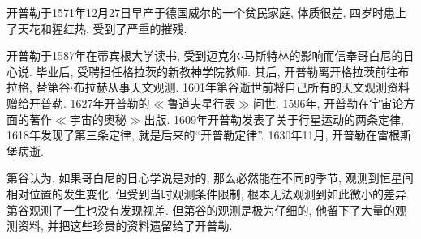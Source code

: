 \documentclass[11pt,a4paper,boxed]{caspset}
\newlength\picwidth
\newlength\pichigh
\begin{document}
\begin{window}
开普勒于1571年12月27日早产于德国威尔的一个贫民家庭, 体质很差, 四岁时患上了天花和猩红热, 受到了严重的摧残.

开普勒于1587年在蒂宾根大学读书, 受到迈克尔$\cdot$马斯特林的影响而信奉哥白尼的日心说. 毕业后, 受聘担任格拉茨的新教神学院教师. 其后, 开普勒离开格拉茨前往布拉格, 替第谷$\cdot$布拉赫从事天文观测. 1601年第谷逝世前将自己所有的天文观测资料赠给开普勒. 1627年开普勒的$\ll$鲁道夫星行表$\gg$问世.
1596年, 开普勒在宇宙论方面的著作$\ll$宇宙的奧秘$\gg$出版. 1609年开普勒发表了关于行星运动的两条定律, 1618年发现了第三条定律, 就是后来的``开普勒定律''.
1630年11月, 开普勒在雷根斯堡病逝.
\end{window}

第谷认为, 如果哥白尼的日心学说是对的, 那么必然能在不同的季节, 观测到恒星间相对位置的发生变化. 但受到当时观测条件限制, 根本无法观测到如此微小的差异. 第谷观测了一生也没有发现视差. 但第谷的观测是极为仔细的, 他留下了大量的观测资料, 并把这些珍贵的资料遗留给了开普勒.
\end{document}
